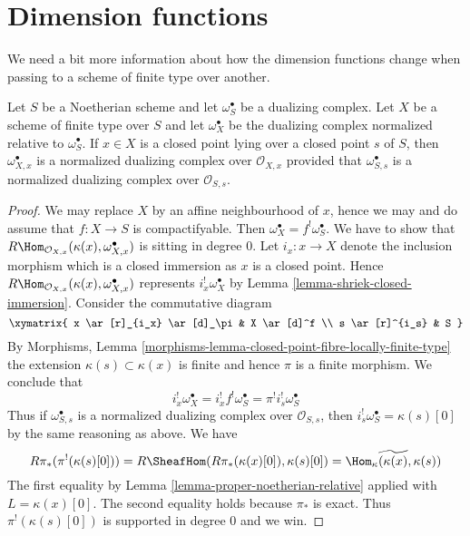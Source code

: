 \section{Dimension functions}
\label{section-dimension-functions}

\noindent
We need a bit more information about how the dimension functions change
when passing to a scheme of finite type over another.

\begin{lemma}
\label{lemma-good-dualizing-normalized}
Let $S$ be a Noetherian scheme and let $\omega_S^\bullet$ be a
dualizing complex. Let $X$ be a scheme of finite type over $S$ and let
$\omega_X^\bullet$ be the dualizing complex normalized relative
to $\omega_S^\bullet$. If $x \in X$ is a closed point lying over
a closed point $s$ of $S$, then $\omega_{X, x}^\bullet$
is a normalized dualizing complex over $\mathcal{O}_{X, x}$
provided that $\omega_{S, s}^\bullet$ is a normalized dualizing
complex over $\mathcal{O}_{S, s}$.
\end{lemma}

\begin{proof}
We may replace $X$ by an affine neighbourhood of $x$, hence we may
and do assume that $f : X \to S$ is compactifyable.
Then $\omega_X^\bullet = f^!\omega_S^\bullet$. We have to show that
$R\Hom_{\mathcal{O}_{X, x}}(\kappa(x), \omega_{X, x}^\bullet)$
is sitting in degree $0$. Let $i_x : x \to X$ denote the inclusion
morphism which is a closed immersion as $x$ is a closed point.
Hence $R\Hom_{\mathcal{O}_{X, x}}(\kappa(x), \omega_{X, x}^\bullet)$
represents $i_x^!\omega_X^\bullet$ by
Lemma \ref{lemma-shriek-closed-immersion}.
Consider the commutative diagram
$$
\xymatrix{
x \ar[r]_{i_x} \ar[d]_\pi & X \ar[d]^f \\
s \ar[r]^{i_s} & S
}
$$
By Morphisms, Lemma
\ref{morphisms-lemma-closed-point-fibre-locally-finite-type}
the extension $\kappa(s) \subset \kappa(x)$ is finite and hence
$\pi$ is a finite morphism. We conclude that
$$
i_x^!\omega_X^\bullet = i_x^! f^! \omega_S^\bullet =
\pi^! i_s^! \omega_S^\bullet
$$
Thus if $\omega_{S, s}^\bullet$ is a normalized dualizing complex
over $\mathcal{O}_{S, s}$, then $i_s^!\omega_S^\bullet = \kappa(s)[0]$
by the same reasoning as above. We have
$$
R\pi_*(\pi^!(\kappa(s)[0])) = R\SheafHom(R\pi_*(\kappa(x)[0]), \kappa(s)[0]) =
\widetilde{\Hom_\kappa(\kappa(x), \kappa(s))}
$$
The first equality by Lemma \ref{lemma-proper-noetherian-relative}
applied with $L = \kappa(x)[0]$. The second equality holds because
$\pi_*$ is exact.
Thus $\pi^!(\kappa(s)[0])$ is supported in degree $0$ and we win.
\end{proof}

